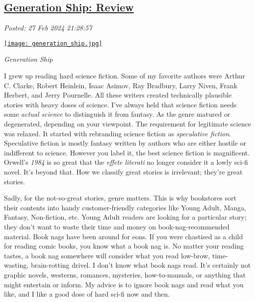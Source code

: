 %

\subsection*{\href{http://analyzethedatanotthedrivel.org/2024/02/27/generation-ship-review/}{Generation Ship: Review}}


\noindent\emph{Posted: 27 Feb 2024 21:28:57}
\vspace{6pt}


\captionsetup[floatingfigure]{labelformat=empty}
\begin{floatingfigure}[l]{0.22\textwidth}
 \centering
 \href{https://www.goodreads.com/book/show/63876699-generation-ship}{\texttt{[image: generation\_ship.jpg]}}
\caption{\emph{Generation Ship}}
\label{fig:8017x0}
\end{floatingfigure} I grew up reading hard science fiction. Some of my favorite authors were
Arthur C. Clarke, Robert Heinlein, Isaac Asimov, Ray Bradbury, Larry
Niven, Frank Herbert, and Jerry Pournelle. All these writers created
technically plausible stories with heavy doses of science. I've always
held that science fiction needs some \emph{actual science} to
distinguish it from fantasy. As the genre matured or degenerated,
depending on your viewpoint. The requirement for legitimate science was
relaxed. It started with rebranding science fiction as \emph{speculative
fiction}. Speculative fiction is mostly fantasy written by authors who
are either hostile or indifferent to science. However you label it, the
best science fiction is magnificent. Orwell's \emph{1984} is so great
that the \emph{effete literati} no longer consider it a lowly sci-fi
novel. It's beyond that. How we classify great stories is irrelevant;
they're great stories.

Sadly, for the not-so-great stories, genre matters. This is why
bookstores sort their contents into handy customer-friendly categories
like Young Adult, Manga, Fantasy, Non-fiction, etc. Young Adult readers
are looking for a particular story; they don't want to waste their time
and money on book-nag-recommended material. Book nags have been around
for eons. If you were chastised as a child for reading comic books, you
know what a book nag is. No matter your reading tastes, a book nag
somewhere will consider what you read low-brow, time-wasting,
brain-rotting drivel. I don't know what book nags read. It's certainly
not graphic novels, westerns, romances, mysteries, how-to-manuals, or
anything that might entertain or inform. My advice is to ignore book
nags and read what you like, and I like a good dose of hard sci-fi now
and then.

